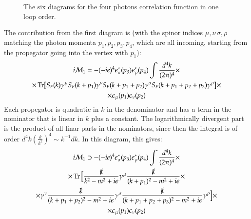 \documentclass{article}
\begin{document}
\begin{figure}[ht]
\begin{minipage}{0.31\textwidth}
    \end{minipage}

    \caption{The six diagrams for the four photons correlation function in one loop order.}
    \label{fig:fourphoton}
\end{figure}
The contribution from the first diagram is (with the spinor indices $\mu, \nu\, \sigma, \rho$ matching the photon momenta $p_1, p_2, p_3, p_4$, which are all incoming, starting from the propegator going into the vertex with $p_1$):
\begin{equation}
\begin{gathered}
    i \mathcal{M}_1 =
    -(-ie)^4\epsilon^*_\sigma(p_3)\epsilon^*_\rho(p_4)
    \int \frac{d^4k}{(2\pi)^4}
    \times \\ \times
    \Tr[S_F(k)\gamma^\mu S_F(k + p_1) \gamma^\nu S_F(k + p_1 + p_2)\gamma^\sigma S_F(k + p_1 + p_2 + p_3) \gamma^\rho]
    \times \\ \times
    \epsilon_\mu(p_1)\epsilon_\nu(p_2)
\end{gathered}
\end{equation}
Each propegator is quadratic in $k$ in the denominator and has a term in the nominator that is linear in $k$ plus a constant. The logarithmically divergent part is the product of all linar parts in the nominators, since then the integral is of order $d^4k \left(\frac{k}{k^2}\right)^4 \sim k^{-1} dk$. In this diagram, this gives:
\begin{equation}
\begin{gathered}
    i \mathcal{M}_1 \supset
    -(-ie)^4\epsilon^*_\sigma(p_3)\epsilon^*_\rho(p_4)
    \int \frac{d^4k}{(2\pi)^4}
    \times \\ \times
    \Tr\Big[\frac{\slashed{k}}{k^2 - m^2 + i\epsilon}\gamma^\mu \frac{\slashed{k}}{(k + p_1)^2 - m^2 + i\epsilon}
    \times \\ \times
    \gamma^\nu\frac{\slashed{k}}{(k + p_1 + p_2)^2 - m^2 + i\epsilon}\gamma^\sigma \frac{\slashed{k}}{(k + p_1 + p_2 + p_3)^2 - m^2 + i\epsilon}\gamma^\rho \Big]
    \times \\ \times
    \epsilon_\mu(p_1)\epsilon_\nu(p_2)
\end{gathered}
\end{equation}
\end{document}
